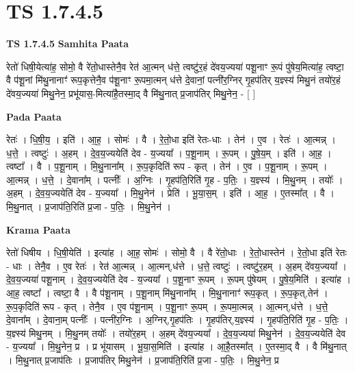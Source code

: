 \documentclass[17pt]{extarticle}
\begin{document}
\section{ TS 1.7.4.5 }

\textbf{TS 1.7.4.5 } \newline
\textbf{Samhita Paata} \newline

रेतो॑ धिषी॒येत्या॑ह॒ सोमो॒ वै रे॑तो॒धास्तेनै॒व रेत॑ आ॒त्मन् ध॑त्ते॒ त्वष्टु॑र॒हं दे॑वय॒ज्यया॑ पशू॒नाꣳ रू॒पं पु॑षेय॒मित्या॑ह॒ त्वष्टा॒ वै प॑शू॒नां मि॑थु॒नानाꣳ॑ रूप॒कृत्तेनै॒व प॑शू॒नाꣳ रू॒पमा॒त्मन् ध॑त्ते दे॒वानां॒ पत्नी॑र॒ग्निर् गृ॒हप॑तिर् य॒ज्ञ्स्य॑ मिथु॒नं तयो॑र॒हं दे॑वय॒ज्यया॑ मिथु॒नेन॒ प्रभू॑यास॒-मित्या॑है॒तस्मा॒द् वै मि॑थु॒नात् प्र॒जाप॑तिर् मिथु॒नेन॒ - [ ] \newline

\textbf{Pada Paata} \newline

रेतः॑ । धि॒षी॒य॒ । इति॑ । आ॒ह॒ । सोमः॑ । वै । रे॒तो॒धा इति॑ रेतः-धाः । तेन॑ । ए॒व । रेतः॑ । आ॒त्मन्न् । ध॒त्ते॒ । त्वष्टुः॑ । अ॒हम् । दे॒व॒य॒ज्ययेति॑ देव - य॒ज्यया᳚ । प॒शू॒नाम् । रू॒पम् । पु॒षे॒य॒म् । इति॑ । आ॒ह॒ । त्वष्टा᳚ । वै । प॒शू॒नाम् । मि॒थु॒नाना᳚म् । रू॒प॒कृदिति॑ रूप - कृत् । तेन॑ । ए॒व । प॒शू॒नाम् । रू॒पम् । आ॒त्मन्न् । ध॒त्ते॒ । दे॒वाना᳚म् । पत्नीः᳚ । अ॒ग्निः । गृ॒हप॑ति॒रिति॑ गृ॒ह - प॒तिः॒ । य॒ज्ञ्स्य॑ । मि॒थु॒नम् । तयोः᳚ । अ॒हम् । दे॒व॒य॒ज्ययेति॑ देव - य॒ज्यया᳚ । मि॒थु॒नेन॑ । प्रेति॑ । भू॒या॒स॒म् । इति॑ । आ॒ह॒ । ए॒तस्मा᳚त् । वै । मि॒थु॒नात् । प्र॒जाप॑ति॒रिति॑ प्र॒जा - प॒तिः॒ । मि॒थु॒नेन॑ ।  \newline


\textbf{Krama Paata} \newline

रेतो॑ धिषीय । धि॒षी॒येति॑ । इत्या॑ह । आ॒ह॒ सोमः॑ । सोमो॒ वै । वै रे॑तो॒धाः । रे॒तो॒धास्तेन॑ । रे॒तो॒धा इति॑ रेतः - धाः । तेनै॒व । ए॒व रेतः॑ । रेत॑ आ॒त्मन्न् । आ॒त्मन्,ध॑त्ते । ध॒त्ते॒ त्वष्टुः॑ । त्वष्टु॑र॒हम् । अ॒हम् दे॑वय॒ज्यया᳚ । दे॒व॒य॒ज्यया॑ पशू॒नाम् । दे॒व॒य॒ज्ययेति॑ देव - य॒ज्यया᳚ । प॒शू॒नाꣳ रू॒पम् । रू॒पम् पु॑षेयम् । पु॒षे॒य॒मिति॑ । इत्या॑ह । आ॒ह॒ त्वष्टा᳚ । त्वष्टा॒ वै । वै प॑शू॒नाम् । प॒शू॒नाम् मि॑थु॒नाना᳚म् । मि॒थु॒नानाꣳ॑ रूप॒कृत् । रू॒प॒कृत्,तेन॑ । रू॒प॒कृदिति॑ रूप - कृत् । तेनै॒व । ए॒व प॑शू॒नाम् । प॒शू॒नाꣳ रू॒पम् । रू॒पमा॒त्मन्न् । आ॒त्मन्,ध॑त्ते । ध॒त्ते॒ दे॒वाना᳚म् । दे॒वाना॒म् पत्नीः᳚ । पत्नी॑र॒ग्निः । अ॒ग्निर्,गृ॒हप॑तिः । गृ॒हप॑तिर्,य॒ज्ञ्स्य॑ । गृ॒हप॑ति॒रिति॑ गृ॒ह - प॒तिः॒ । य॒ज्ञ्स्य॑ मिथु॒नम् । मि॒थु॒नम् तयोः᳚ । तयो॑र॒हम् । अ॒हम् दे॑वय॒ज्यया᳚ । दे॒व॒य॒ज्यया॑ मिथु॒नेन॑ । दे॒व॒य॒ज्ययेति॑ देव - य॒ज्यया᳚ । मि॒थु॒नेन॒ प्र । प्र भू॑यासम् । भू॒या॒स॒मिति॑ । इत्या॑ह । आ॒है॒तस्मा᳚त् । ए॒तस्मा॒द् वै । वै मि॑थु॒नात् । मि॒थु॒नात् प्र॒जाप॑तिः । प्र॒जाप॑तिर् मिथु॒नेन॑ । प्र॒जाप॑ति॒रिति॑ प्र॒जा - प॒तिः॒ । मि॒थु॒नेन॒ प्र \newline
\end{document}
